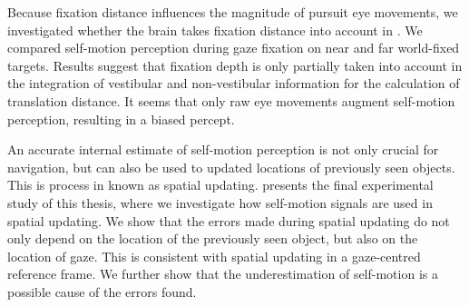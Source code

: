 Because fixation distance influences the magnitude of pursuit eye movements, we investigated  whether the brain takes fixation distance into account in . We compared self-motion perception during gaze fixation on near and far world-fixed targets. Results suggest that fixation depth is only partially taken into account in the integration of vestibular and non-vestibular information for the calculation of translation distance. It seems that only raw eye movements augment self-motion perception, resulting in a biased percept.

An accurate internal estimate of self-motion perception is not only crucial for navigation, but can also be used to updated locations of previously seen objects. This is process in known as spatial updating.  presents the final experimental study of this thesis, where we investigate how self-motion signals are used in spatial updating. We show that the errors made during spatial updating do not only depend on the location of the previously seen object, but also on the location of gaze. This is consistent with spatial updating in a gaze-centred reference frame. We further show that the underestimation of self-motion is a possible cause of the errors found.
